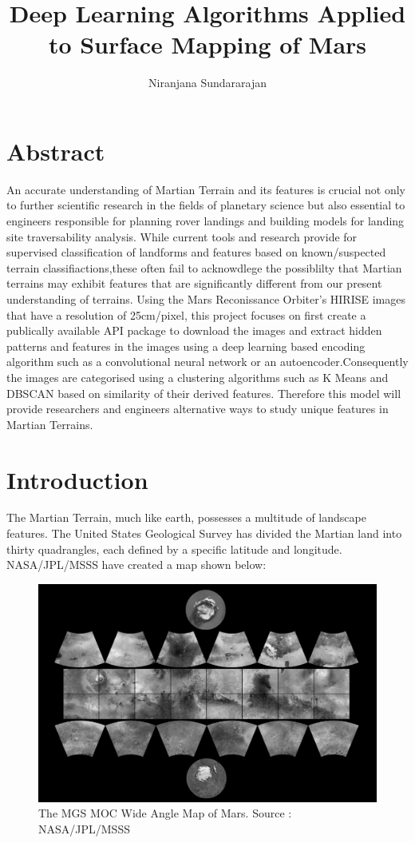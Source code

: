 \documentclass[project-plan]{report-template}
\title{Deep Learning Algorithms Applied to Surface Mapping of Mars}
\author{Niranjana Sundararajan}
\begin{document}
\maketitlepage  %

\section*{Abstract}

An accurate understanding of Martian Terrain and its features is crucial not only to further  scientific research in the fields of planetary science but also essential to engineers responsible for planning rover landings and building models for landing site traversability analysis. While current tools and research provide for supervised classification of landforms and features based on known/suspected terrain classifiactions,these often fail to acknowdlege the possiblilty that Martian terrains may exhibit features that are significantly different from our present understanding of terrains. 
Using the Mars Reconissance Orbiter's HIRISE images that have a resolution of 25cm/pixel, this project focuses on first create a publically available API package to download the images and extract hidden patterns and features in the images using a deep learning based encoding algorithm such as a convolutional neural network or an autoencoder.Consequently the images are categorised using a clustering algorithms such as K Means and DBSCAN based on similarity of their derived features.
Therefore this model will provide researchers and engineers alternative ways to study unique features in Martian Terrains. 


\section{Introduction}

The Martian Terrain, much like earth, possesses a multitude of landscape features. The United States Geological Survey has divided the Martian land into thirty quadrangles, each defined by a specific latitude and longitude. NASA/JPL/MSSS have created a map shown below:
\begin{figure}[h]
    \begin{center}
        \includegraphics[width=1\textwidth]{quadrangles-NASA-JPL-MSSS.jpg}
    \end{center}
    \caption{\label{fig:Martian Quadrangles} The MGS MOC Wide Angle Map of Mars. Source : NASA/JPL/MSSS }
\end{figure}
\end{document}
